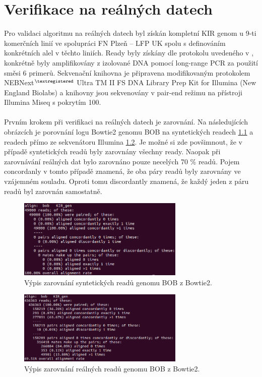 \documentclass[czech,DP]{thesiskiv}
\numberwithin{equation}{section}
\begin{document}
\chapter{Verifikace na reálných datech}
Pro validaci algoritmu na reálných datech byl získán kompletní KIR genom u 9-ti komerčních linií ve spolupráci FN Plzeň – LFP UK spolu s definováním konkrétních alel v těchto liniích. Ready byly získány dle protokolu uvedeného v \cite{real_data}, konkrétně  byly amplifikovány z izolované DNA pomocí long-range PCR za použití směsi 6 primerů. Sekvenační knihovna je připravena modifikovaným protokolem NEBNext$^{\textregistered}$ Ultra TM II FS DNA Library Prep Kit for Illumina (New England Biolabs) a knihovny jsou sekvenovány v pair-end režimu na přístroji Illumina Miseq s pokrytím 100.  
\\
\\
Prvním krokem při verifikaci na reálných datech je zarovnání. Na následujících obrázcích je porovnání logu Bowtie2 genomu BOB na syntetických readech \ref{fig:bob_syntetic_bowtie_align} a readech přímo ze sekvenátoru Illumina \ref{fig:bob_real_bowtie_align}. Je možné si zde povšimnout, že v případě syntetických readů byly zarovnány všechny ready. Naopak při zarovnávání reálných dat bylo zarovnáno pouze necelých 70 \% readů. Pojem concordanly v tomto případě znamená, že oba páry readů byly zarovnány ve vzájemném souladu. Oproti tomu discordantly znamená, že každý jeden z páru readů byl zarovnán samostatně.

\begin{figure}[H]		
		\centering
		\includegraphics[width=300px]{./img/bob_syntetic_bowtie_align.png}
		\caption{Výpis zarovnání syntetických readů genomu BOB z Bowtie2.}
		\label{fig:bob_syntetic_bowtie_align}
\end{figure}

\begin{figure}[H]		
		\centering
		\includegraphics[width=300px]{./img/bob_real_bowtie_align.png}
		\caption{Výpis zarovnání reálných readů genomu BOB z Bowtie2.}
		\label{fig:bob_real_bowtie_align}
\end{figure}
\end{document}
